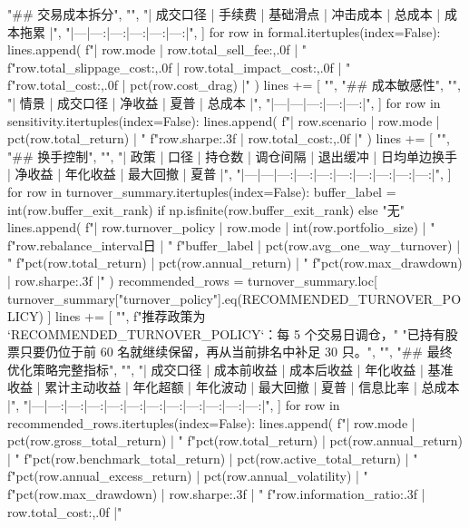 \documentclass[UTF8,a4paper,fontset=fandol]{ctexart}
\begin{document}
\begin{ProjectCode}
{        "## 交易成本拆分",
        "",
        "| 成交口径 | 手续费 | 基础滑点 | 冲击成本 | 总成本 | 成本拖累 |",
        "|---|---:|---:|---:|---:|---:|",
    ]
    for row in formal.itertuples(index=False):
        lines.append(
            f"| {row.mode} | {row.total_sell_fee:,.0f} | "
            f"{row.total_slippage_cost:,.0f} | {row.total_impact_cost:,.0f} | "
            f"{row.total_cost:,.0f} | {pct(row.cost_drag)} |"
        )
    lines += [
        "",
        "## 成本敏感性",
        "",
        "| 情景 | 成交口径 | 净收益 | 夏普 | 总成本 |",
        "|---|---|---:|---:|---:|",
    ]
    for row in sensitivity.itertuples(index=False):
        lines.append(
            f"| {row.scenario} | {row.mode} | {pct(row.total_return)} | "
            f"{row.sharpe:.3f} | {row.total_cost:,.0f} |"
        )
    lines += [
        "",
        "## 换手控制",
        "",
        "| 政策 | 口径 | 持仓数 | 调仓间隔 | 退出缓冲 | 日均单边换手 | 净收益 | 年化收益 | 最大回撤 | 夏普 |",
        "|---|---|---:|---:|---:|---:|---:|---:|---:|---:|",
    ]
    for row in turnover_summary.itertuples(index=False):
        buffer_label = int(row.buffer_exit_rank) if np.isfinite(row.buffer_exit_rank) else "无"
        lines.append(
            f"| {row.turnover_policy} | {row.mode} | {int(row.portfolio_size)} | "
            f"{row.rebalance_interval}日 | "
            f"{buffer_label} | {pct(row.avg_one_way_turnover)} | "
            f"{pct(row.total_return)} | {pct(row.annual_return)} | "
            f"{pct(row.max_drawdown)} | {row.sharpe:.3f} |"
        )
    recommended_rows = turnover_summary.loc[
        turnover_summary["turnover_policy"].eq(RECOMMENDED_TURNOVER_POLICY)
    ]
    lines += [
        "",
        f"推荐政策为 `{RECOMMENDED_TURNOVER_POLICY}`：每 5 个交易日调仓，"
        "已持有股票只要仍位于前 60 名就继续保留，再从当前排名中补足 30 只。",
        "",
        "## 最终优化策略完整指标",
        "",
        "| 成交口径 | 成本前收益 | 成本后收益 | 年化收益 | 基准收益 | 累计主动收益 | 年化超额 | 年化波动 | 最大回撤 | 夏普 | 信息比率 | 总成本 |",
        "|---|---:|---:|---:|---:|---:|---:|---:|---:|---:|---:|---:|",
    ]
    for row in recommended_rows.itertuples(index=False):
        lines.append(
            f"| {row.mode} | {pct(row.gross_total_return)} | "
            f"{pct(row.total_return)} | {pct(row.annual_return)} | "
            f"{pct(row.benchmark_total_return)} | {pct(row.active_total_return)} | "
            f"{pct(row.annual_excess_return)} | {pct(row.annual_volatility)} | "
            f"{pct(row.max_drawdown)} | {row.sharpe:.3f} | "
            f"{row.information_ratio:.3f} | {row.total_cost:,.0f} |"
}
\end{ProjectCode}
\end{document}
